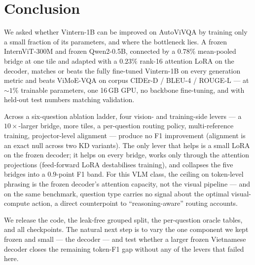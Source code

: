 \section{Conclusion}
\label{sec:conclusion}

We asked whether Vintern-1B can be improved on AutoViVQA by training only a small
fraction of its parameters, and where the bottleneck lies. A frozen InternViT-300M
and frozen Qwen2-0.5B, connected by a $0.78\%$ mean-pooled bridge at one tile and
adapted with a $0.23\%$ rank-16 attention LoRA on the decoder, matches or beats
the fully fine-tuned Vintern-1B on every generation metric and beats ViMoE-VQA on
corpus CIDEr-D / BLEU-4 / ROUGE-L --- at ${\sim}1\%$ trainable parameters, one
16\,GB GPU, no backbone fine-tuning, and with held-out test numbers matching
validation.

Across a six-question ablation ladder, four vision- and training-side levers ---
a $10\times$-larger bridge, more tiles, a per-question routing policy,
multi-reference training, projector-level alignment --- produce no F1 improvement
(alignment is an exact null across two KD variants). The only lever that helps is a small LoRA on the
frozen decoder; it helps on every bridge, works only through the attention
projections (feed-forward LoRA destabilises training), and collapses the five
bridges into a $0.9$-point F1 band. For this VLM class, the ceiling on
token-level phrasing is the frozen decoder's attention capacity, not the visual
pipeline --- and on the same benchmark, question type carries no signal about the
optimal visual-compute action, a direct counterpoint to ``reasoning-aware''
routing accounts.

We release the code, the leak-free grouped split, the per-question oracle tables,
and all checkpoints. The natural next step is to vary the one component we kept
frozen and small --- the decoder --- and test whether a larger frozen Vietnamese
decoder closes the remaining token-F1 gap without any of the levers that failed
here.
